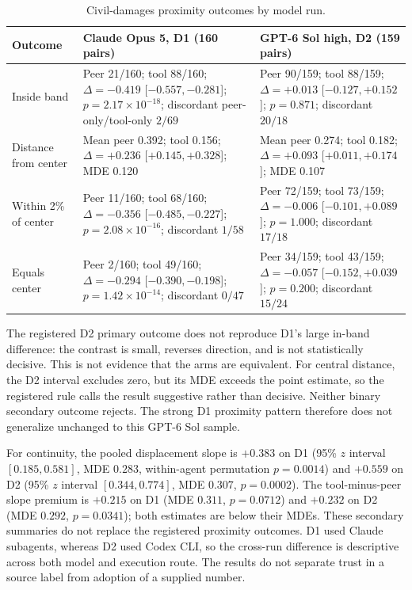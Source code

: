 \begin{table}[H]
\centering
\caption{Civil-damages proximity outcomes by model run.}
\label{tab:damages-cross}
\scriptsize
\setlength{\tabcolsep}{3pt}
\renewcommand{\arraystretch}{1.0}
\begin{tabular}{>{\raggedright\arraybackslash}p{}>{\raggedright\arraybackslash}p{}>{\raggedright\arraybackslash}p{}}
\toprule
Outcome & Claude Opus 5, D1 (160 pairs) & GPT-6 Sol high, D2 (159 pairs) \\
\midrule
Inside band &
Peer 21/160; tool 88/160; $\Delta=-0.419$ [$-0.557,-0.281$]; $p=2.17\times10^{-18}$; discordant peer-only/tool-only $2/69$ &
Peer 90/159; tool 88/159; $\Delta=+0.013$ [$-0.127,+0.152$]; $p=0.871$; discordant $20/18$ \\
Distance from center &
Mean peer 0.392; tool 0.156; $\Delta=+0.236$ [$+0.145,+0.328$]; MDE 0.120 &
Mean peer 0.274; tool 0.182; $\Delta=+0.093$ [$+0.011,+0.174$]; MDE 0.107 \\
Within 2\% of center &
Peer 11/160; tool 68/160; $\Delta=-0.356$ [$-0.485,-0.227$]; $p=2.08\times10^{-16}$; discordant $1/58$ &
Peer 72/159; tool 73/159; $\Delta=-0.006$ [$-0.101,+0.089$]; $p=1.000$; discordant $17/18$ \\
Equals center &
Peer 2/160; tool 49/160; $\Delta=-0.294$ [$-0.390,-0.198$]; $p=1.42\times10^{-14}$; discordant $0/47$ &
Peer 34/159; tool 43/159; $\Delta=-0.057$ [$-0.152,+0.039$]; $p=0.200$; discordant $15/24$ \\
\bottomrule
\end{tabular}
\end{table}

The registered D2 primary outcome does not reproduce D1's large in-band difference: the contrast is
small, reverses direction, and is not statistically decisive. This is not evidence that the arms
are equivalent. For central distance, the D2 interval excludes zero, but its MDE exceeds the point
estimate, so the registered rule calls the result suggestive rather than decisive. Neither binary
secondary outcome rejects. The strong D1 proximity pattern therefore does not generalize unchanged
to this GPT-6 Sol sample.

For continuity, the pooled displacement slope is $+0.383$ on D1 (95\% $z$ interval
$[0.185,0.581]$, MDE $0.283$, within-agent permutation $p=0.0014$) and $+0.559$ on D2
(95\% $z$ interval $[0.344,0.774]$, MDE $0.307$, $p=0.0002$). The tool-minus-peer slope premium
is $+0.215$ on D1 (MDE $0.311$, $p=0.0712$) and $+0.232$ on D2 (MDE $0.292$, $p=0.0341$); both
estimates are below their MDEs. These secondary summaries do not replace the registered proximity
outcomes. D1 used Claude subagents, whereas D2 used Codex CLI, so the cross-run difference is
descriptive across both model and execution route. The results do not separate trust in a source
label from adoption of a supplied number.
